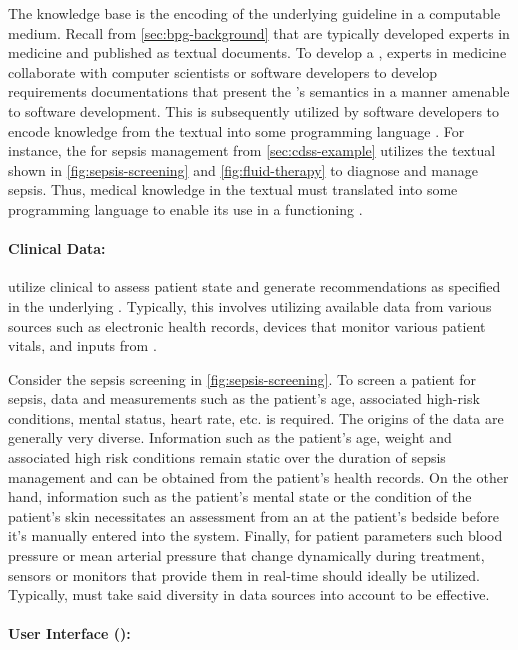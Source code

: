 The knowledge base is the encoding of the underlying guideline in a
computable medium. Recall from \autoref{sec:bpg-background}
that \BPGs{} are typically developed experts in medicine and published
as textual documents. To develop a \CDSS{}, experts in medicine
collaborate with computer scientists or software developers to
develop requirements documentations that present the \BPG{}'s
semantics in a manner amenable to software development.
This is subsequently utilized by software developers to encode
knowledge from the textual \BPG{} into some programming language \cite{PelegJBI13}.
For instance, the \CDSS{} for sepsis management from \autoref{sec:cdss-example}
utilizes the textual \BPG{} shown in \autoref{fig:sepsis-screening}
and \autoref{fig:fluid-therapy} to diagnose and manage sepsis.
Thus, medical knowledge in the textual \BPG{} must translated into some
programming language to enable its use in a functioning \CDSS{}.

\paragraph{Clinical Data:}

\CDSSs{} utilize clinical to assess patient state and
generate recommendations as specified in the underlying \BPG{}. Typically, this involves
utilizing available data from various sources such as electronic health records,
devices that monitor various patient vitals, and inputs from \HCPs{}.

Consider the sepsis screening \BPG{} in \autoref{fig:sepsis-screening}.
To screen a patient for sepsis, data and
measurements such as the patient's age, associated high-risk conditions,
mental status, heart rate, etc. is required. The origins
of the data are generally very diverse. Information such
as the patient's age, weight and associated high risk conditions
remain static over the duration of sepsis management and can be
obtained from the patient's health records.
On the other hand, information such as the patient's mental
state or the condition of the patient's skin necessitates an assessment from an
\HCP{} at the patient's bedside before it's manually entered into the system.
Finally, for patient parameters such blood pressure or mean arterial pressure
that change dynamically during treatment, sensors or monitors
that provide them in real-time should ideally be utilized.
Typically, \CDSS{} must take said diversity in data sources into account
to be effective.

\paragraph{User Interface (\UI{}):}


